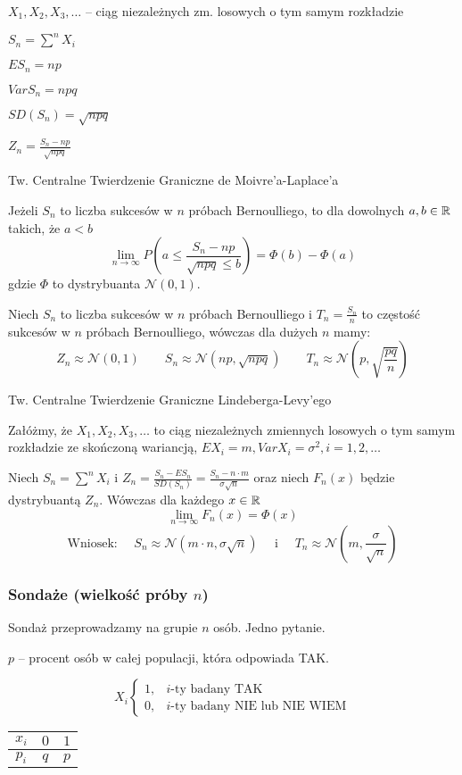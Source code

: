 \documentclass[../Matematyka.tex]{subfiles}
\begin{document}
\(X_1, X_2, X_3, \ldots\) -- ciąg niezależnych zm. losowych o tym samym rozkładzie

\(S_n = \sum^n X_i\)

\(ES_n = np\)

\(VarS_n = npq\)

\(SD(S_n) = \sqrt{npq}\)

\(Z_n = \frac{S_n - np}{\sqrt{npq}}\)

Tw. Centralne Twierdzenie Graniczne de Moivre'a-Laplace'a

Jeżeli \(S_n\) to liczba sukcesów w \(n\) próbach Bernoulliego, to dla dowolnych \(a, b \in \mathbb{R}\) takich, że \(a < b\)
\[\lim_{n\rightarrow\infty} P(a \leq \frac{S_n - np}{\sqrt{npq} \leq b}) = \Phi(b) - \Phi(a)\]
gdzie \(\Phi\) to dystrybuanta \(\mathcal{N}(0,1)\).

Niech \(S_n\) to liczba sukcesów w \(n\) próbach Bernoulliego i \(T_n = \frac{S_n}{n}\) to częstość sukcesów w \(n\) próbach Bernoulliego, wówczas dla dużych \(n\) mamy:
\[Z_n \approx \mathcal{N}(0,1) \qquad S_n \approx \mathcal{N}(np, \sqrt{npq}) \qquad T_n \approx \mathcal{N}(p, \sqrt{\frac{pq}{n}})\]

Tw. Centralne Twierdzenie Graniczne Lindeberga-Levy'ego

Załóżmy, że \(X_1, X_2, X_3, \ldots\) to ciąg niezależnych zmiennych losowych o tym samym rozkładzie ze skończoną wariancją, \(EX_i = m, VarX_i=\sigma^2, i=1,2,\ldots\)

Niech \(S_n = \sum^n X_i\) i \(Z_n = \frac{S_n - ES_n}{SD(S_n)} = \frac{S_n - n \cdot m}{\sigma\sqrt{n}}\) oraz niech \(F_n(x)\) będzie dystrybuantą \(Z_n\). Wówczas dla każdego \(x \in \mathbb{R}\)
\[\lim_{n\rightarrow\infty}F_n(x) = \Phi(x)\]
\[\text{Wniosek: }\quad S_n \approx \mathcal{N}(m\cdot n, \sigma\sqrt{n}) \quad\text{ i }\quad T_n \approx \mathcal{N}(m, \frac{\sigma}{\sqrt{n}})\]

\subsubsection*{Sondaże (wielkość próby \(n\))}
Sondaż przeprowadzamy na grupie \(n\) osób. Jedno pytanie.

\(p\) -- procent osób w całej populacji, która odpowiada TAK.

\begin{multicols}{2}
    \[X_i \begin{cases}
            1, & i\text{-ty badany TAK}              \\
            0, & i\text{-ty badany NIE lub NIE WIEM}
        \end{cases}\]

    \begin{table}[H]
        \centering
        \begin{tabular}{c|c|c}
            \(x_i\) & \(0\) & \(1\) \\\hline
            \(p_i\) & \(q\) & \(p\)
        \end{tabular}
    \end{table}
\end{multicols}
\end{document}
